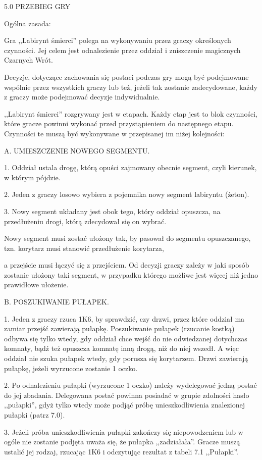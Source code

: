 5.0 PRZEBIEG GRY

Ogólna zasada:

Gra ,,Labirynt śmierci'' polega na wykonywaniu przez graczy określonych czynności.
Jej celem jest odnalezienie przez oddział i zniszczenie magicznych Czarnych Wrót.

Decyzje, dotyczące zachowania się postaci podczas gry mogą być podejmowane wspólnie przez wszystkich graczy lub też, jeżeli tak zostanie zadecydowane, każdy z graczy może podejmować decyzje indywidualnie.

,,Labirynt śmierci'' rozgrywany jest w etapach.
Każdy etap jest to blok czynności, które gracze powinni wykonać przed przystąpieniem do następnego etapu.
Czynności te muszą być wykonywane w przepisanej im niżej kolejności:

A. UMIESZCZENIE NOWEGO SEGMENTU.

1.
Oddział ustala drogę, którą opuści zajmowany obecnie segment, czyli kierunek, w którym pójdzie.

2.
Jeden z graczy losowo wybiera z pojemnika nowy segment labiryntu (żeton).

3.
Nowy segment układany jest obok tego, który oddział opuszcza, na przedłużeniu drogi, którą zdecydował się on wybrać.

Nowy segment musi zostać ułożony tak, by pasował do segmentu opuszczanego, tzn. korytarz musi stanowić przedłużenie korytarza,

a przejście musi łączyć się z przejściem.
Od decyzji graczy zależy w jaki sposób zostanie ułożony taki segment, w przypadku którego możliwe jest więcej niż jedno prawidłowe ułożenie.

B. POSZUKIWANIE PUŁAPEK.

1.
Jeden z graczy rzuca 1K6, by sprawdzić, czy drzwi, przez które oddział ma zamiar przejść zawierają pułapkę.
Poszukiwanie pułapek (rzucanie kostką) odbywa się tylko wtedy, gdy oddział chce wejść do nie odwiedzanej dotychczas komnaty, bądź też opuszcza komnatę inną drogą, niż do niej wszedł.
A więc oddział nie szuka pułapek wtedy, gdy porusza się korytarzem.
Drzwi zawierają pułapkę, jeżeli wyrzucone zostanie 1 oczko.

2.
Po odnalezieniu pułapki (wyrzucone 1 oczko) należy wydelegować jedną postać do jej zbadania.
Delegowana postać powinna posiadać w grupie zdolności hasło ,,pułapki'', gdyż tylko wtedy może podjąć próbę unieszkodliwienia znalezionej pułapki (patrz 7.0).

3.
Jeżeli próba unieszkodliwienia pułapki zakończy się niepowodzeniem lub w ogóle nie zostanie podjęta uważa się, że pułapka ,,zadziałała''.
Gracze muszą ustalić jej rodzaj, rzucając 1K6 i odczytując rezultat z tabeli 7.1 ,,Pułapki''.

